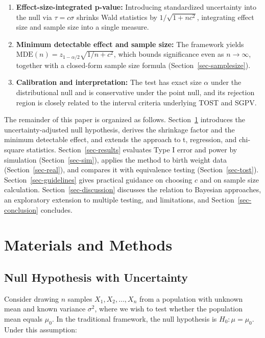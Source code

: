 \documentclass[
  11pt,
  letterpaper,
]{article}
\begin{document}
\begin{enumerate}
\def\labelenumi{\arabic{enumi}.}
\item
  \textbf{Effect-size-integrated p-value:} Introducing standardized
  uncertainty into the null via \(\tau = c\sigma\) shrinks Wald
  statistics by \(1/\sqrt{1+nc^2}\), integrating effect size and sample
  size into a single measure.
\item
  \textbf{Minimum detectable effect and sample size:} The framework
  yields \(\text{MDE}(n) = z_{1-\alpha/2}\sqrt{1/n + c^2}\), which
  bounds significance even as \(n \to \infty\), together with a
  closed-form sample size formula (Section~\ref{sec-samplesize}).
\item
  \textbf{Calibration and interpretation:} The test has exact size
  \(\alpha\) under the distributional null and is conservative under the
  point null, and its rejection region is closely related to the
  interval criteria underlying TOST and SGPV.
\end{enumerate}

The remainder of this paper is organized as follows.
Section~\ref{sec-methods} introduces the uncertainty-adjusted null
hypothesis, derives the shrinkage factor and the minimum detectable
effect, and extends the approach to t, regression, and chi-square
statistics. Section~\ref{sec-results} evaluates Type I error and power
by simulation (Section~\ref{sec-sim}), applies the method to birth
weight data (Section~\ref{sec-real}), and compares it with equivalence
testing (Section~\ref{sec-tost}). Section~\ref{sec-guidelines} gives
practical guidance on choosing \(c\) and on sample size calculation.
Section~\ref{sec-discussion} discusses the relation to Bayesian
approaches, an exploratory extension to multiple testing, and
limitations, and Section~\ref{sec-conclusion} concludes.

\section{Materials and Methods}\label{sec-methods}

\subsection{Null Hypothesis with
Uncertainty}\label{null-hypothesis-with-uncertainty}

Consider drawing \(n\) samples \(X_1, X_2, \ldots, X_n\) from a
population with unknown mean and known variance \(\sigma^2\), where we
wish to test whether the population mean equals \(\mu_0\). In the
traditional framework, the null hypothesis is \(H_0: \mu = \mu_0\).
Under this assumption:
\end{document}
